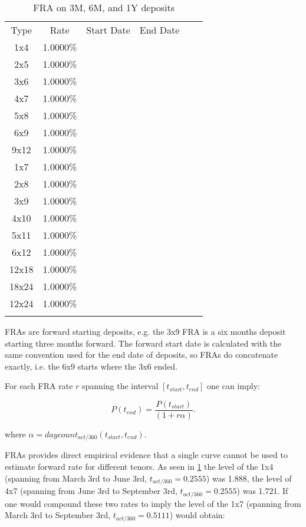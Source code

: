 \documentclass[11pt,reqno]{amsart}
\begin{document}
\begin{table}[tbp]
\label{tab:fra} 
\begin{tabular}{cccccc}
Type & Rate & Start Date & End Date &  &  \\ 
1x4 & 1.0000\% &  &  &  &  \\ 
2x5 & 1.0000\% &  &  &  &  \\ 
3x6 & 1.0000\% &  &  &  &  \\ 
4x7 & 1.0000\% &  &  &  &  \\ 
5x8 & 1.0000\% &  &  &  &  \\ 
6x9 & 1.0000\% &  &  &  &  \\ 
9x12 & 1.0000\% &  &  &  &  \\ 
1x7 & 1.0000\% &  &  &  &  \\ 
2x8 & 1.0000\% &  &  &  &  \\ 
3x9 & 1.0000\% &  &  &  &  \\ 
4x10 & 1.0000\% &  &  &  &  \\ 
5x11 & 1.0000\% &  &  &  &  \\ 
6x12 & 1.0000\% &  &  &  &  \\ 
12x18 & 1.0000\% &  &  &  &  \\ 
18x24 & 1.0000\% &  &  &  &  \\ 
12x24 & 1.0000\% &  &  &  &  \\ 
&  &  &  &  & 
\end{tabular}%
\caption{FRA on 3M, 6M, and 1Y deposits}
\end{table}

FRAs are forward starting deposits, e.g. the 3x9 FRA is a six months deposit
starting three months forward. The forward start date is
calculated with the same convention used for the end date of deposits,
so FRAs do concatenate exactly, i.e. the 6x9 starts where the 3x6 ended.

For each FRA rate $r$ spanning the interval $[t_{start}, t_{end}]$ one can imply:

\begin{equation}
P(t_{end}) = \frac{P(t_{start})}{(1 + r \alpha)}.
\label{eqn:deposit}
\end{equation}

where $\alpha = daycount_{act/360}(t_{start}, t_{end})$.


FRAs provides direct empirical evidence that a single curve 
cannot be used to estimate forward rate for different tenors.
As seen in \ref{tab:fra} the level of the 1x4 
(spanning from March 3rd to June 3rd, $t_{act/360} = 0.2555$) was 1.888,
the level of
4x7 (spanning from June 3rd to September 3rd, $t_{act/360} = 0.2555$) was 1.721.
If one would compound these two rates to imply the level of the 1x7
(spanning from March 3rd to September 3rd, $t_{act/360} = 0.5111$) would obtain:
\end{document}
